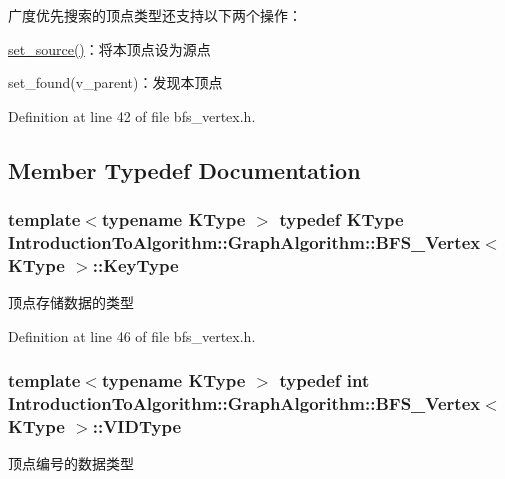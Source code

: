 广度优先搜索的顶点类型还支持以下两个操作：


\begin{DoxyItemize}
\item {\ttfamily \hyperlink{struct_introduction_to_algorithm_1_1_graph_algorithm_1_1_b_f_s___vertex_a3f5b9ba686fae02e01cd899261fe6793}{set\+\_\+source()}}：将本顶点设为源点
\item {\ttfamily set\+\_\+found(v\+\_\+parent)}：发现本顶点 
\end{DoxyItemize}

Definition at line 42 of file bfs\+\_\+vertex.\+h.



\subsection{Member Typedef Documentation}
\hypertarget{struct_introduction_to_algorithm_1_1_graph_algorithm_1_1_b_f_s___vertex_a1e47ba34939458c68d7ccee8ebeccad2}{}
\subsubsection[{Key\+Type}]{\setlength{\rightskip}{0pt plus 5cm}template$<$typename K\+Type $>$ typedef K\+Type {\bf Introduction\+To\+Algorithm\+::\+Graph\+Algorithm\+::\+B\+F\+S\+\_\+\+Vertex}$<$ K\+Type $>$\+::{\bf Key\+Type}}\label{struct_introduction_to_algorithm_1_1_graph_algorithm_1_1_b_f_s___vertex_a1e47ba34939458c68d7ccee8ebeccad2}
顶点存储数据的类型 

Definition at line 46 of file bfs\+\_\+vertex.\+h.

\hypertarget{struct_introduction_to_algorithm_1_1_graph_algorithm_1_1_b_f_s___vertex_a62cef758843cdaeefae2fc196f6bdb46}{}
\subsubsection[{V\+I\+D\+Type}]{\setlength{\rightskip}{0pt plus 5cm}template$<$typename K\+Type $>$ typedef int {\bf Introduction\+To\+Algorithm\+::\+Graph\+Algorithm\+::\+B\+F\+S\+\_\+\+Vertex}$<$ K\+Type $>$\+::{\bf V\+I\+D\+Type}}\label{struct_introduction_to_algorithm_1_1_graph_algorithm_1_1_b_f_s___vertex_a62cef758843cdaeefae2fc196f6bdb46}
顶点编号的数据类型 

